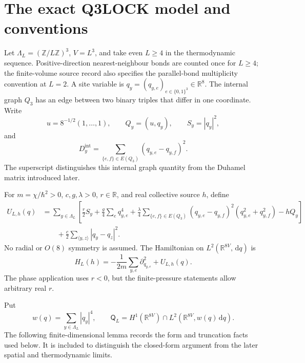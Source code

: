 \documentclass[11pt]{article}
\numberwithin{equation}{section}
\theoremstyle{definition}
\newcommand{\R}{\mathbb R}
\newcommand{\Z}{\mathbb Z}
\newcommand{\dd}{\,\mathrm d}
\begin{document}
\section{The exact Q3LOCK model and conventions}
\label{sec:model}

Let $\Lambda_L=(\Z/L\Z)^3$, $V=L^3$, and take even $L\geq4$ in the
thermodynamic sequence.  Positive-direction nearest-neighbour bonds are
counted once for $L\geq4$; the finite-volume source record also specifies the
parallel-bond multiplicity convention at $L=2$.  A site variable is
$q_y=(q_{y,e})_{e\in\{0,1\}^3}\in\R^8$.  The internal graph $Q_3$ has an
edge between two binary triples that differ in one coordinate.  Write
\[
 u=8^{-1/2}(1,\ldots,1),\qquad Q_y=(u,q_y),\qquad S_y=|q_y|^2,
\]
and
\[
 D_y^{\mathrm{int}}=\sum_{\{e,f\}\in E(Q_3)}(q_{y,e}-q_{y,f})^2.
\]
The superscript distinguishes this internal graph quantity from the Duhamel
matrix introduced later.

For $m=\chi/\hbar^2>0$, $c,g,\lambda>0$, $r\in\R$, and real collective
source $h$, define
\begin{align}
 U_{L,h}(q)
 &=\sum_{y\in\Lambda_L}\left[
       \frac r2S_y+\frac g4\sum_e q_{y,e}^4
       +\frac\lambda4\sum_{\{e,f\}\in E(Q_3)}
          (q_{y,e}-q_{y,f})^2(q_{y,e}^2+q_{y,f}^2)
       -hQ_y\right]\nonumber\\
 &\qquad+\frac c2\sum_{\langle y,z\rangle}|q_y-q_z|^2. \label{eq:potential}
\end{align}
No radial or $O(8)$ symmetry is assumed.  The Hamiltonian on
$L^2(\R^{8V},\dd q)$ is
\begin{equation}
 H_{L}(h)=-\frac1{2m}\sum_{y,e}\partial_{q_{y,e}}^2+U_{L,h}(q).
 \label{eq:hamiltonian}
\end{equation}
The phase application uses $r<0$, but the finite-pressure statements allow
arbitrary real $r$.

Put
\begin{equation}
 w(q)=\sum_{y\in\Lambda_L}|q_y|^4,
 \qquad
 \mathsf Q_L=H^1(\R^{8V})\cap L^2(\R^{8V},w(q)\dd q).
 \label{eq:form-domain}
\end{equation}
The following finite-dimensional lemma records the form and truncation facts
used below.  It is included to distinguish the closed-form argument from the
later spatial and thermodynamic limits.
\end{document}
